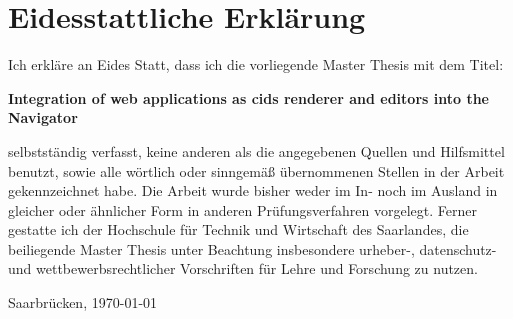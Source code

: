 \chapter*{Eidesstattliche Erklärung}

Ich erkläre an Eides Statt, dass ich die vorliegende Master Thesis mit dem Titel:

\hspace{1.0cm}

{  \bfseries Integration of web applications as cids renderer and editors into the Navigator }

\hspace{1.0cm}

selbstständig verfasst, keine anderen als die angegebenen Quellen und Hilfsmittel
benutzt, sowie alle wörtlich oder sinngemäß übernommenen Stellen in der Arbeit
gekennzeichnet habe. Die Arbeit wurde bisher weder im In- noch im Ausland in
gleicher oder ähnlicher Form in anderen Prüfungsverfahren vorgelegt. Ferner gestatte
ich der Hochschule für Technik und Wirtschaft des Saarlandes, die beiliegende
Master Thesis unter Beachtung insbesondere urheber-, datenschutz- und
wettbewerbsrechtlicher Vorschriften für Lehre und Forschung zu nutzen.


\vfill

{\large Saarbrücken, { \today}}

